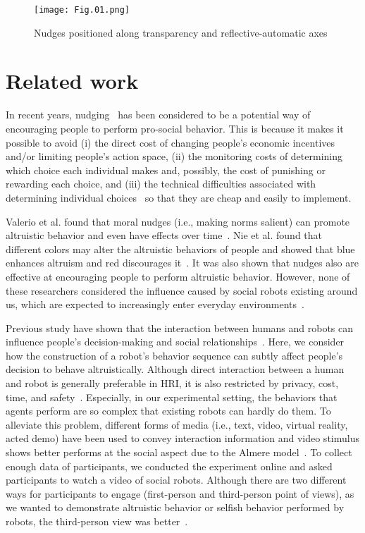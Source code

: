 \documentclass[runningheads]{llncs}
\begin{document}
\begin{figure}[tb]
\texttt{[image: Fig.01.png]}
\centering
\caption{Nudges positioned along transparency and
reflective-automatic axes~\cite{ref_article5}} \label{fig1}
\end{figure}




\section{Related work}

In recent years, nudging~\cite{ref_book2} has been considered to be a potential way of encouraging people to perform pro-social behavior. This is because it makes it possible to avoid (i) the direct cost of changing people's economic incentives and/or limiting people's action space, (ii) the monitoring costs of determining which choice each individual makes and, possibly, the cost of punishing or rewarding each choice, and (iii) the technical difficulties associated with determining individual choices~\cite{ref_article2} so that they are cheap and easily to implement.

Valerio et al. found that moral nudges (i.e., making norms salient) can promote altruistic behavior and even have effects over time~\cite{ref_article2}. Nie et al. found that different colors may alter the altruistic behaviors of people and showed that blue enhances altruism and red discourages it~\cite{ref_article3}. It was also shown that nudges also are effective at encouraging people to perform altruistic behavior. However, none of these researchers considered the influence caused by social robots existing around us, which are expected to increasingly enter everyday environments~\cite{ref_article8}. 

Previous study have shown that the interaction between humans and robots can influence people's decision-making and social relationships~\cite{ref_article9}. Here, we consider how the construction of a robot's behavior sequence can subtly affect people's decision to behave altruistically. Although direct interaction between a human and robot is generally preferable in HRI, it is also restricted by privacy, cost, time, and safety~\cite{ref_article4}. Especially, in our experimental setting, the behaviors that agents perform are so complex that existing robots can hardly do them. To alleviate this problem, different forms of media (i.e., text, video, virtual reality, acted demo) have been used to convey interaction information and video stimulus shows better performs at the social aspect due to the Almere model~\cite{ref_article40}. To collect enough data of participants, we conducted the experiment online and asked participants to watch a video of social robots. Although there are two different ways for participants to engage (first-person and third-person point of views), as we wanted to demonstrate altruistic behavior or selfish behavior performed by robots, the third-person view was better~\cite{ref_article12}. 
\end{document}

